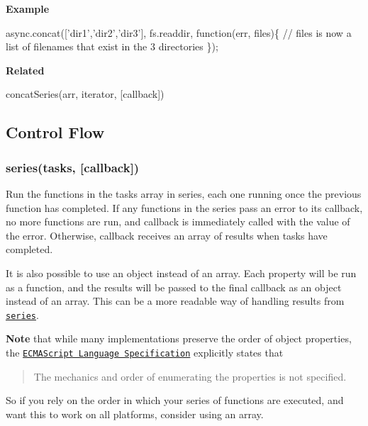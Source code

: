 {\bfseries Example}


\begin{DoxyCode}
async.concat(['dir1','dir2','dir3'], fs.readdir, function(err, files)\{
    // files is now a list of filenames that exist in the 3 directories
\});
\end{DoxyCode}


{\bfseries Related}


\begin{DoxyItemize}
\item concat\+Series(arr, iterator, \mbox{[}callback\mbox{]})
\end{DoxyItemize}

\subsection*{Control Flow}

\label{_series}%
 \subsubsection*{series(tasks, \mbox{[}callback\mbox{]})}

Run the functions in the {\ttfamily tasks} array in series, each one running once the previous function has completed. If any functions in the series pass an error to its callback, no more functions are run, and {\ttfamily callback} is immediately called with the value of the error. Otherwise, {\ttfamily callback} receives an array of results when {\ttfamily tasks} have completed.

It is also possible to use an object instead of an array. Each property will be run as a function, and the results will be passed to the final {\ttfamily callback} as an object instead of an array. This can be a more readable way of handling results from \href{#series}{\tt {\ttfamily series}}.

{\bfseries Note} that while many implementations preserve the order of object properties, the \href{http://www.ecma-international.org/ecma-262/5.1/#sec-8.6}{\tt E\+C\+M\+A\+Script Language Specification} explicitly states that

\begin{quote}
The mechanics and order of enumerating the properties is not specified. \end{quote}


So if you rely on the order in which your series of functions are executed, and want this to work on all platforms, consider using an array.

